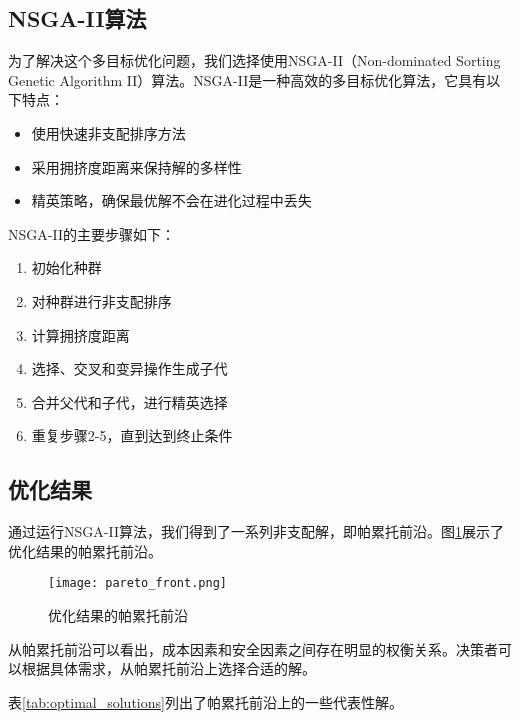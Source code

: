 \subsection{NSGA-II算法}

为了解决这个多目标优化问题，我们选择使用NSGA-II（Non-dominated Sorting Genetic Algorithm II）算法。NSGA-II是一种高效的多目标优化算法，它具有以下特点：

\begin{itemize}
	\item 使用快速非支配排序方法
	\item 采用拥挤度距离来保持解的多样性
	\item 精英策略，确保最优解不会在进化过程中丢失
\end{itemize}

NSGA-II的主要步骤如下：

\begin{enumerate}
	\item 初始化种群
	\item 对种群进行非支配排序
	\item 计算拥挤度距离
	\item 选择、交叉和变异操作生成子代
	\item 合并父代和子代，进行精英选择
	\item 重复步骤2-5，直到达到终止条件
\end{enumerate}

\subsection{优化结果}

通过运行NSGA-II算法，我们得到了一系列非支配解，即帕累托前沿。图\ref{fig:pareto}展示了优化结果的帕累托前沿。

\begin{figure}[H]
	\centering
	\texttt{[image: pareto\_front.png]}
	\caption{优化结果的帕累托前沿}
	\label{fig:pareto}
\end{figure}

从帕累托前沿可以看出，成本因素和安全因素之间存在明显的权衡关系。决策者可以根据具体需求，从帕累托前沿上选择合适的解。

表\ref{tab:optimal_solutions}列出了帕累托前沿上的一些代表性解。

